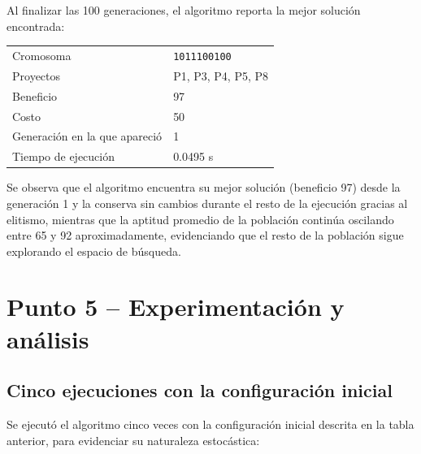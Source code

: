 \documentclass[12pt,a4paper]{article}
\begin{document}
Al finalizar las 100 generaciones, el algoritmo reporta la mejor
soluci\'{o}n encontrada:

\begin{center}
\small
\begin{tabular}{ll}
\toprule
Cromosoma & \texttt{1011100100} \\
Proyectos & P1, P3, P4, P5, P8 \\
Beneficio & 97 \\
Costo & 50 \\
Generaci\'{o}n en la que apareci\'{o} & 1 \\
Tiempo de ejecuci\'{o}n & 0.0495 s \\
\bottomrule
\end{tabular}
\end{center}


Se observa que el algoritmo encuentra su mejor soluci\'{o}n
(beneficio 97) desde la generaci\'{o}n 1 y la conserva sin cambios
durante el resto de la ejecuci\'{o}n gracias al elitismo, mientras que
la aptitud promedio de la poblaci\'{o}n contin\'{u}a oscilando entre 65 y
92 aproximadamente, evidenciando que el resto de la poblaci\'{o}n
sigue explorando el espacio de b\'{u}squeda.

\section{Punto 5 -- Experimentaci\'{o}n y an\'{a}lisis}

\subsection{Cinco ejecuciones con la configuraci\'{o}n inicial}

Se ejecut\'{o} el algoritmo cinco veces con la configuraci\'{o}n inicial
descrita en la tabla anterior, para evidenciar su naturaleza
estoc\'{a}stica:

\begin{table}[H]
\centering
\caption{Cinco ejecuciones con la configuraci\'{o}n inicial}
\label{tab:punto4}
\end{table}
\end{document}
